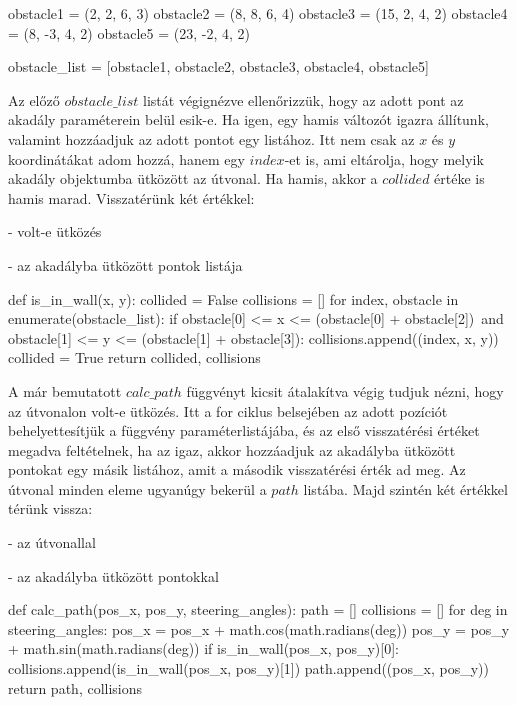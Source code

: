 \begin{python}
obstacle1 = (2, 2, 6, 3)
obstacle2 = (8, 8, 6, 4)
obstacle3 = (15, 2, 4, 2)
obstacle4 = (8, -3, 4, 2)
obstacle5 = (23, -2, 4, 2)

obstacle_list = [obstacle1, obstacle2, obstacle3, obstacle4, obstacle5]
\end{python}

Az előző $ obstacle\_list $ listát végignézve ellenőrizzük, hogy az adott pont az akadály paraméterein belül esik-e. Ha igen, egy hamis változót igazra állítunk, valamint hozzáadjuk az adott pontot egy listához. Itt nem csak az $ x $ és $ y $ koordinátákat adom hozzá, hanem egy $ index $-et is, ami eltárolja, hogy melyik akadály objektumba ütközött az útvonal. Ha hamis, akkor a $ collided $ értéke is hamis marad. Visszatérünk két értékkel:

- volt-e ütközés

- az akadályba ütközött pontok listája

\begin{python}
def is_in_wall(x, y):
    collided = False
    collisions = []
    for index, obstacle in enumerate(obstacle_list):
        if obstacle[0] <= x <= (obstacle[0] + obstacle[2])\
                and obstacle[1] <= y <= (obstacle[1] + obstacle[3]):
            collisions.append((index, x, y))
            collided = True
    return collided, collisions
\end{python}

A már bemutatott $calc\_path$ függvényt kicsit átalakítva végig tudjuk nézni, hogy az útvonalon volt-e ütközés. Itt a for ciklus belsejében az adott pozíciót behelyettesítjük a függvény paraméterlistájába, és az első visszatérési értéket megadva feltételnek, ha az igaz, akkor hozzáadjuk az akadályba ütközött pontokat egy másik listához, amit a második visszatérési érték ad meg. Az útvonal minden eleme ugyanúgy bekerül a $ path $ listába. Majd szintén két értékkel térünk vissza:

- az útvonallal

- az akadályba ütközött pontokkal

\begin{python}
def calc_path(pos_x, pos_y, steering_angles):
    path = []
    collisions = []
    for deg in steering_angles:
        pos_x = pos_x + math.cos(math.radians(deg))
        pos_y = pos_y + math.sin(math.radians(deg))
        if is_in_wall(pos_x, pos_y)[0]:
            collisions.append(is_in_wall(pos_x, pos_y)[1])
        path.append((pos_x, pos_y))
    return path, collisions
\end{python}

